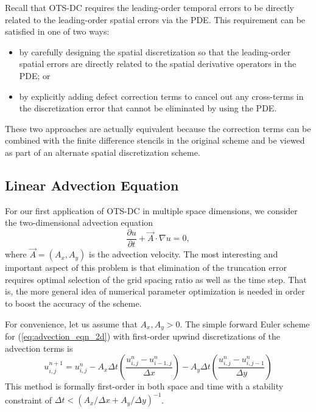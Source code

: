 \documentclass[fleqn,12pt,twoside]{article}
\newcommand{\beq}{\begin{equation}}
\newcommand{\eeq}{\end{equation}}
\def\dt{\Delta t}
\def\dx{\Delta x}
\def\dy{\Delta y}
\begin{document}
Recall that OTS-DC requires the leading-order temporal errors to be directly 
related to the leading-order spatial errors via the PDE.  This requirement can 
be satisfied in one of two ways:
\begin{itemize}
\item by carefully designing the spatial discretization so that the
      leading-order spatial errors are directly related to the spatial 
      derivative operators in the PDE; or
\item by explicitly adding defect correction terms to cancel out any 
      cross-terms in the discretization error that cannot be eliminated 
      by using the PDE.
\end{itemize}
These two approaches are actually equivalent because the correction terms 
can be combined with the finite difference stencils in the original scheme 
and be viewed as part of an alternate spatial discretization scheme. 


\subsection{Linear Advection Equation}
For our first application of OTS-DC in multiple space dimensions, we 
consider the two-dimensional advection equation
\beq
  \frac{\partial u}{\partial t} + \vec{A} \cdot \nabla u = 0,
  \label{eq:advection_eqn_2d}
\eeq
where $\vec{A} = (A_x, A_y)$ is the advection velocity.  
The most interesting and important aspect of this problem is that elimination 
of the truncation error requires optimal selection of the grid spacing ratio 
as well as the time step.  That is, the more general idea of numerical 
parameter optimization is needed in order to boost the accuracy of the scheme.

For convenience, let us assume that $A_x, A_y > 0$.  The simple forward Euler 
scheme for (\ref{eq:advection_eqn_2d}) with first-order upwind discretizations 
of the advection terms is 
\beq
  u^{n+1}_{i,j} = u^{n}_{i,j}
  - A_x \dt \left( \frac{u^{n}_{i,j} - u^{n}_{i-1,j}}{\dx} \right)
  - A_y \dt \left( \frac{u^{n}_{i,j} - u^{n}_{i,j-1}}{\dy} \right)
  \label{eq:advection_eqn_2d_FD_scheme}
\eeq
This method is formally first-order in both space and time with a 
stability constraint of $\dt < \left( A_x/\dx + A_y/\dy \right)^{-1}$.
\end{document}
